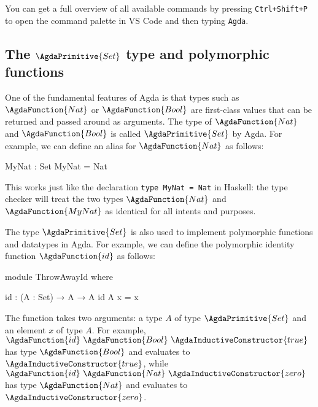 \documentclass[a4paper,UKenglish]{tufte-handout}
\theoremstyle{definition}
\newcommand\prim[1]{{\AgdaPrimitive{#1}}}
\newcommand\ty[1]{{{\prim{Set}}_{#1}}}
\newcommand\fun[1]{{\AgdaFunction{#1}}}
\newcommand\data[1]{{\AgdaFunction{#1}}}
\newcommand\con[1]{{\AgdaInductiveConstructor{#1}}}
\newcommand\Nat{\data{Nat}}
\newcommand\zero{\con{zero}}
\newcommand\Bool{\data{Bool}}
\newcommand\true{\con{true}}
\begin{document}


You can get a full overview of all available commands by pressing
\texttt{Ctrl+Shift+P} to open the command palette in VS Code and then typing
\texttt{Agda}.


\subsection{The $\ty{}$ type and polymorphic functions}

One of the fundamental features of Agda is that types such as
$\data{Nat}$ or $\data{Bool}$ are first-class values that can be
returned and passed around as arguments. The type of $\data{Nat}$ and
$\data{Bool}$ is called $\ty{}$ by Agda. For example, we can define an
alias for $\data{Nat}$ as follows:
\begin{code}[number]
MyNat : Set
MyNat = Nat
\end{code}
This works just like the declaration \texttt{type MyNat = Nat} in
Haskell: the type checker will treat the two types $\data{Nat}$ and
$\fun{MyNat}$ as identical for all intents and purposes.

The type $\ty{}$ is also used to implement polymorphic functions and
datatypes in Agda. For example, we can define the polymorphic identity
function $\fun{id}$ as follows:
\begin{code}[hide]
module ThrowAwayId where
\end{code}
\begin{code}[number]
  id : (A : Set) → A → A
  id A x = x
\end{code}
The function \fun{id} takes two arguments: a type $A$ of type $\ty{}$
and an element $x$ of type $A$. For example, $\fun{id}\ \Bool\ \true$
has type $\Bool$ and evaluates to $\true$, while
$\fun{id}\ \Nat\ \zero$ has type $\Nat$ and evaluates to $\zero$.
\end{document}
